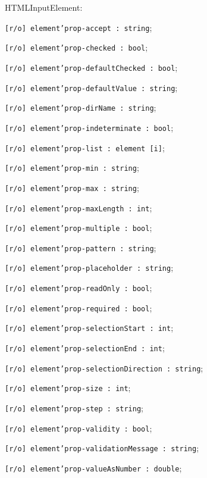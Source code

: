 \begin{icItems}
	\item HTMLInputElement:
	\begin{icItems}
		\item \texttt{[r/o] element'prop-accept : string};
		\item \texttt{[r/o] element'prop-checked : bool};
		\item \texttt{[r/o] element'prop-defaultChecked : bool};
		\item \texttt{[r/o] element'prop-defaultValue : string};
		\item \texttt{[r/o] element'prop-dirName : string};
		\item \texttt{[r/o] element'prop-indeterminate : bool};
		\item \texttt{[r/o] element'prop-list : element [i]};
		\item \texttt{[r/o] element'prop-min : string};
		\item \texttt{[r/o] element'prop-max : string};
		\item \texttt{[r/o] element'prop-maxLength : int};
		\item \texttt{[r/o] element'prop-multiple : bool};
		\item \texttt{[r/o] element'prop-pattern : string};
		\item \texttt{[r/o] element'prop-placeholder : string};
		\item \texttt{[r/o] element'prop-readOnly : bool};
		\item \texttt{[r/o] element'prop-required : bool};
		\item \texttt{[r/o] element'prop-selectionStart : int};
		\item \texttt{[r/o] element'prop-selectionEnd : int};
		\item \texttt{[r/o] element'prop-selectionDirection : string};
		\item \texttt{[r/o] element'prop-size : int};
		\item \texttt{[r/o] element'prop-step : string};
		\item \texttt{[r/o] element'prop-validity : bool};
		\item \texttt{[r/o] element'prop-validationMessage : string};
		\item \texttt{[r/o] element'prop-valueAsNumber : double};
	\end{icItems}
	

\end{icItems}
